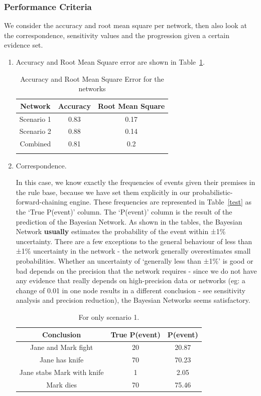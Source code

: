 \subsubsection{Performance Criteria}
We consider the accuracy and root mean square per network, then also look at the correspondence, sensitivity values and the progression given a certain evidence set.

\begin{enumerate}
\item Accuracy and Root Mean Square error are shown in Table~\ref{tabAcc}. 

\begin{table}[h]
\begin{center}
\begin{tabular}{|c|c|c|}
 \hline
 Network & Accuracy & Root Mean Square\\
 \hline
 Scenario 1   & 0.83 &  0.17   \\
 Scenario 2 & 0.88 & 0.14 \\
 Combined & 0.81 & 0.2 \\
\hline
\label{tabAcc}
\end{tabular}
\caption{Accuracy and Root Mean Square Error for the networks}
\end{center}
\end{table}

\item Correspondence.

In this case, we know exactly the frequencies of events given their premises in the rule base, because we have set them explicitly in our probabilistic-forward-chaining engine. These frequencies are represented in Table~\ref{test} as the `True P(event)' column. The `P(event)' column is the result of the prediction of the Bayesian Network. As shown in the tables, the Bayesian Network \textbf{usually} estimates the probability of the event within ±1\% uncertainty. There are a few exceptions to the general behaviour of less than ±1\% uncertainty in the network - the network generally overestimates small probabilities. Whether an uncertainty of `generally less than ±1\%' is good or bad depends on the precision that the network requires - since we do not have any evidence that really depends on high-precision data or networks (eg: a change of 0.01 in one node results in a different conclusion - see sensitivity analysis and precision reduction), the Bayesian Networks seems satisfactory. 


\begin{table}
\begin{center}
\begin{tabular}{|c|c|c|}
 \hline
 Conclusion & True P(event) & P(event) \\
 \hline
 Jane and Mark fight   & 20 &  20.87   \\
 Jane has knife & 70 & 70.23 \\
 Jane stabs Mark with knife & 1 & 2.05 \\
 Mark dies & 70 & 75.46 \\ 
\hline
\end{tabular}
\caption{For only scenario 1.}


\end{center}
\end{table}
\end{enumerate}

